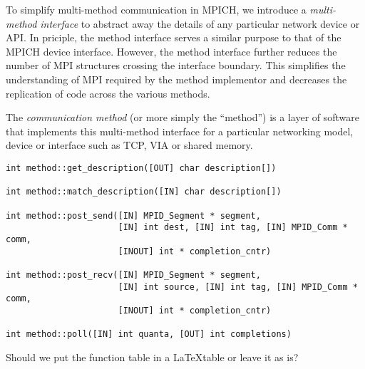 
To simplify multi-method communication in MPICH, we introduce a
\emph{multi-method interface} to abstract away the details of any particular
network device or API.  In priciple, the method interface serves a similar
purpose to that of the MPICH device interface.  However, the method interface
further reduces the number of MPI structures crossing the interface boundary.
This simplifies the understanding of MPI required by the method implementor and
decreases the replication of code across the various methods.

The \emph{communication method} (or more simply the ``method'') is a layer of
software that implements this multi-method interface for a particular
networking model, device or interface such as TCP, VIA or shared memory.

\begin{verbatim}
int method::get_description([OUT] char description[])

int method::match_description([IN] char description[])

int method::post_send([IN] MPID_Segment * segment,
                      [IN] int dest, [IN] int tag, [IN] MPID_Comm * comm,
                      [INOUT] int * completion_cntr)

int method::post_recv([IN] MPID_Segment * segment,
                      [IN] int source, [IN] int tag, [IN] MPID_Comm * comm,
                      [INOUT] int * completion_cntr)

int method::poll([IN] int quanta, [OUT] int completions)
\end{verbatim}

\begin{cmt}[BRT]
Should we put the function table in a \LaTeX table or leave it as is?
\end{cmt}

